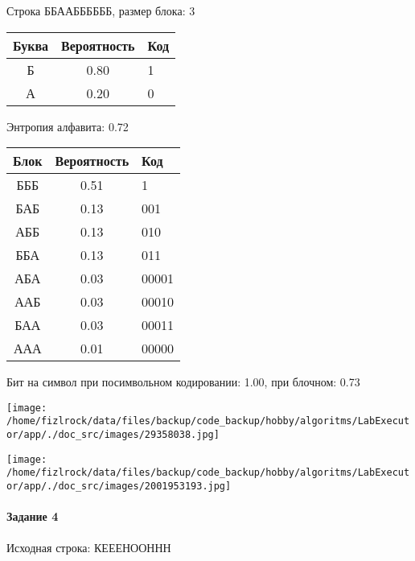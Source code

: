 \documentclass[a4paper, 12pt]{article}
\begin{document}
Строка ББААББББББ, размер блока: 3
\begin{center}
 \begin{tabular}{ |c|c|l| } 
  \hline
     Буква & Вероятность & Код\\ \hline
Б & 0.80 & 1\\\hline
А & 0.20 & 0
\\ \hline \end{tabular}
\end{center}
Энтропия алфавита: 0.72
\begin{center}
 \begin{tabular}{ |c|c|l| } 
  \hline
     Блок & Вероятность & Код\\ \hline
БББ & 0.51 & 1\\\hline
БАБ & 0.13 & 001\\\hline
АББ & 0.13 & 010\\\hline
ББА & 0.13 & 011\\\hline
АБА & 0.03 & 00001\\\hline
ААБ & 0.03 & 00010\\\hline
БАА & 0.03 & 00011\\\hline
ААА & 0.01 & 00000
\\ \hline \end{tabular}
\end{center}
Бит на символ при посимвольном кодировании: 1.00, при блочном: 0.73

\texttt{[image: /home/fizlrock/data/files/backup/code\_backup/hobby/algoritms/LabExecutor/app/./doc\_src/images/29358038.jpg]}

\texttt{[image: /home/fizlrock/data/files/backup/code\_backup/hobby/algoritms/LabExecutor/app/./doc\_src/images/2001953193.jpg]}
\paragraph{Задание 4}


Исходная строка: КЕЕЕНООННН
\end{document}
